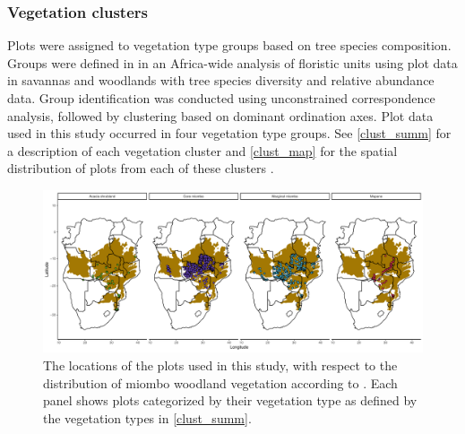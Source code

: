 \documentclass[11pt,a4paper]{article}
\begin{document}
% 

\subsubsection{Vegetation clusters}

Plots were assigned to vegetation type groups based on tree species composition. Groups were defined in \citet{Fayolle2018} in an Africa-wide analysis of floristic units using plot data in savannas and woodlands with tree species diversity and relative abundance data. Group identification was conducted using unconstrained correspondence analysis, followed by clustering based on dominant ordination axes. Plot data used in this study occurred in four vegetation type groups. See \autoref{clust_summ} for a description of each vegetation cluster and \autoref{clust_map} for the spatial distribution of plots from each of these clusters .

\begin{landscape}


\begin{figure}[H]
\centering
	\includegraphics[width=1.4\textwidth]{clust_map}
	\caption{The locations of the \nplots{} plots used in this study, with respect to the distribution of miombo woodland vegetation according to \citet{White1987}. Each panel shows plots categorized by their vegetation type as defined by the vegetation types in \autoref{clust_summ}.}
	\label{clust_map}
\end{figure}
\end{landscape}
\end{document}
